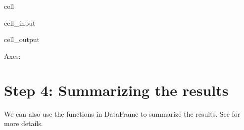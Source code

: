 \documentclass[letterpaper,10pt,english]{jupyterBook}
\begin{document}
\begin{sphinxuseclass}{cell}\begin{sphinxVerbatimInput}

\begin{sphinxuseclass}{cell_input}
\begin{sphinxVerbatim}[commandchars=\\\{\}]
\PYG{p}{[}\PYG{p}{]}
\end{sphinxVerbatim}

\end{sphinxuseclass}\end{sphinxVerbatimInput}
\begin{sphinxVerbatimOutput}

\begin{sphinxuseclass}{cell_output}
\begin{sphinxVerbatim}[commandchars=\\\{\}]
\PYGZlt{}Axes: \PYGZgt{}
\end{sphinxVerbatim}

\noindent{}

\end{sphinxuseclass}\end{sphinxVerbatimOutput}

\end{sphinxuseclass}

\section{Step 4: Summarizing the results}
\label{\detokenize{docs/Ex_Lecture_Demo_Inventory_Sim:step-4-summarizing-the-results}}
\sphinxAtStartPar
We can also use the functions in DataFrame to summarize the results.
See  for more details.
\end{document}
